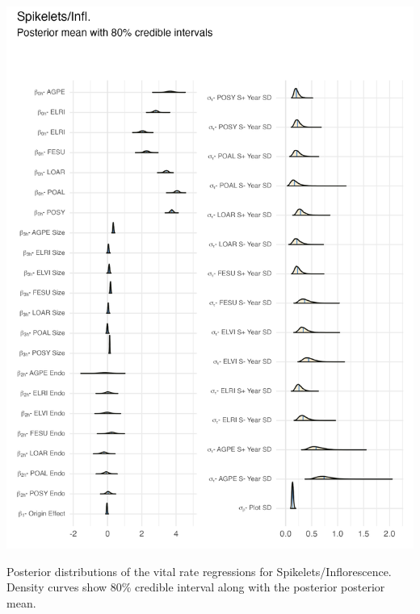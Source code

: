 \documentclass[lineno, sn-basic]{sn-jnl}%
\begin{document}
\begin{myfigure}[H]
	\centering
	\includegraphics[width = \linewidth]{spike_posteriors_plot.png}
	\caption[Posterior distributions of the vital rate regressions for Spikelets/Inflorescence]{Posterior distributions of the vital rate regressions for Spikelets/Inflorescence. Density curves show $80\%$ credible interval along with the posterior posterior mean.}
\end{myfigure}
\end{document}
